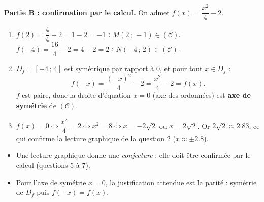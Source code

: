 \documentclass[11pt]{article}
\begin{document}
\begin{corrige}
\textbf{Partie B : confirmation par le calcul.} On admet $f(x)=\dfrac{x^2}{4}-2$.
\begin{enumerate}
\item[5.] $f(2)=\dfrac{4}{4}-2=1-2=-1$ : $M(2\,;\,-1)\in(\mathcal{C})$. $f(-4)=\dfrac{16}{4}-2=4-2=2$ : $N(-4\,;\,2)\in(\mathcal{C})$.
\item[6.] $D_f=[-4\,;\,4]$ est symétrique par rapport à $0$, et pour tout $x\in D_f$ :
\[ f(-x)=\frac{(-x)^2}{4}-2=\frac{x^2}{4}-2=f(x). \]
$f$ est paire, donc la droite d'équation $x=0$ (axe des ordonnées) est \textbf{axe de symétrie} de $(\mathcal{C})$.
\item[7.] $f(x)=0\iff \dfrac{x^2}{4}=2\iff x^2=8\iff x=-2\sqrt{2}$ ou $x=2\sqrt{2}$. Or $2\sqrt{2}\approx \num{2,83}$, ce qui confirme la lecture graphique de la question 2 ($x\approx \pm\num{2,8}$).
\end{enumerate}
\end{corrige}

\begin{attention}
\begin{itemize}
\item Une lecture graphique donne une \emph{conjecture} : elle doit être confirmée par le calcul (questions 5 à 7).
\item Pour l'axe de symétrie $x=0$, la justification attendue est la parité : symétrie de $D_f$ puis $f(-x)=f(x)$.
\end{itemize}
\end{attention}
\end{document}
